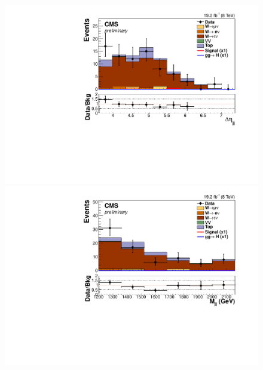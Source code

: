 \begin{figure}
  \includegraphics[width=.65\largefigwidth]{plots/parked/HIG-14-038-figs/output_sigreg/taunu_dijet_deta.pdf}
  \includegraphics[width=.65\largefigwidth]{plots/parked/HIG-14-038-figs/output_sigreg/taunu_dijet_M.pdf}


\end{figure}
